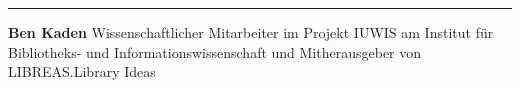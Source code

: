 \documentclass[output=paper]{langscibook}
\begin{document}
\begin{center}\rule{0.5\linewidth}{0.5pt}\end{center}


\textbf{Ben Kaden} Wissenschaftlicher Mitarbeiter im Projekt IUWIS am
Institut für Bibliotheks- und Informationswissenschaft und
Mitherausgeber von LIBREAS.Library Ideas

\end{document}
